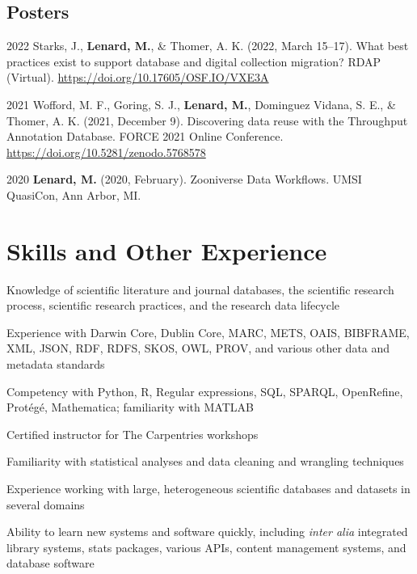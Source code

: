 \documentclass[12pt,letterpaper]{report}
\newcommand{\listitemspace}{0.25em}
\renewenvironment{itemize}
{\begin{list}{}{\setlength{\leftmargin}{0em}
            \setlength{\parskip}{0em}
            \setlength{\itemsep}{\listitemspace}
            \setlength{\parsep}{\listitemspace}}}
{\end{list}}
\begin{document}
\subsection*{Posters}
    
\begin{tablist}
    
	\item[2022] \tab Starks, J., \textbf{Lenard, M.}, \& Thomer, A. K. (2022, March 15--17). What best practices exist to support database and digital collection migration? RDAP (Virtual). \href{https://osf.io/vxe3a/}{https://doi.org/10.17605/OSF.IO/VXE3A}
	
	\item[2021] \tab Wofford, M. F., Goring, S. J., \textbf{Lenard, M.}, Dominguez Vidana, S. E., \& Thomer, A. K. (2021, December 9). Discovering data reuse with the Throughput Annotation Database. FORCE 2021 Online Conference. \href{https://doi.org/10.5281/zenodo.5768578}{https://doi.org/10.5281/zenodo.5768578}
	
	\item[2020] \tab \textbf{Lenard, M.} (2020, February). Zooniverse Data Workflows. UMSI QuasiCon, Ann Arbor, MI.

\end{tablist}



\section*{Skills and Other Experience}

\begin{itemize}

	\item Knowledge of scientific literature and journal databases, the scientific research process, scientific research practices, and the research data lifecycle
        
	\item Experience with Darwin Core, Dublin Core, MARC, METS, OAIS, BIBFRAME, XML, JSON, RDF, RDFS, SKOS, OWL, PROV, and various other data and metadata standards
        
	\item Competency with Python, R, Regular expressions, SQL, SPARQL, OpenRefine, Protégé, Mathematica; familiarity with MATLAB
	
	\item Certified instructor for The Carpentries workshops
        
	\item Familiarity with statistical analyses and data cleaning and wrangling techniques

	\item Experience working with large, heterogeneous scientific databases and datasets in several domains

	\item Ability to learn new systems and software quickly, including \textit{inter alia} integrated library systems, stats packages, various APIs, content management systems, and database software
        
\end{itemize}
\end{document}

